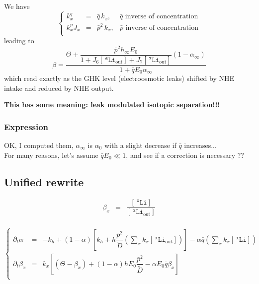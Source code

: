 \documentclass[aps,onecolumn,12pt]{revtex4}
\newcommand{\mychem}[1]{\mathtt{#1}}
\newcommand{\myconc}[1]{\left\lbrack{#1}\right\rbrack}
\newcommand{\spLi}[1]{{~^{\mychem{#1}}\mychem{Li}}}
\newcommand{\Li}[1]{\myconc{\spLi{#1}}}
\newcommand{\spLiOut}[1]{{\spLi{#1}}_{\mathrm{out}}}
\newcommand{\LiOut}[1]{\myconc{\spLiOut{#1}}}
\begin{document}
We have
\begin{equation}
\left\lbrace
	\begin{array}{rcll}
	k_x^q    & = & \bar{q}\,k_x,  &  \bar{q}\text{ inverse of concentration}\\
	k_x^pJ_x & = & \bar{p}^2\,k_x, & \bar{p}\text{ inverse of concentration}\\
	\end{array}
\right.
\end{equation}
leading to
\begin{equation}
	\label{steady_beta}
	\beta = \dfrac{\Theta+\dfrac{\bar{p}^2 h_\infty E_0}{1+J_6\LiOut{6}+J_7\LiOut{7}} \left(1-\alpha_\infty\right)}{1+\bar{q}E_0\alpha_\infty}
\end{equation}
which read exactly as the GHK level (electroosmotic leaks) shifted by NHE intake and reduced by NHE output.

\centerline{\bf This has some meaning: leak modulated isotopic separation!!!}


\subsubsection{Expression}
OK, I computed them, $\alpha_\infty$ is $\alpha_0$ with a slight decrease if $\bar{q}$ increases...\\
For many reasons, let's assume $\bar{q}E_0\ll 1$, and see if a correction is necessary ??

\subsection{Unified rewrite}
\begin{equation}
\begin{array}{rcl}
	\beta_x    & = & \dfrac{\Li{x}}{\LiOut{x}}\\
\end{array}
\end{equation}

\begin{equation}
\boxed{
\left\lbrace
	\begin{array}{rcl}
		\partial_t\alpha    & = & 
		-k_h 
		+ \left(1-\alpha\right) \left[ k_h + h \dfrac{\bar{p}^2}{\tilde{D}} \left(\sum_x k_x \LiOut{x}\right) \right]
		- \alpha \bar{q} \left( {\sum_x k_x \Li{x}} \right)\\
		\partial_t\beta_x & = & k_x \left[
		\left(\Theta  - \beta_x \right)
		+ \left(1-\alpha\right) h E_0 \dfrac{\bar{p}^2}{\tilde{D}} 
		- \alpha E_0 \bar{q} \beta_x
		\right]
		\\
	\end{array}
\right.
}
\end{equation}
\end{document}

